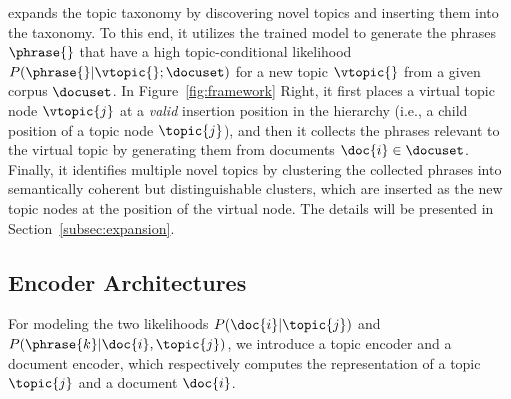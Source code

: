 \label{subsubsec:expansion}
\proposed expands the topic taxonomy by discovering novel topics and inserting them into the taxonomy.
To this end, it utilizes the trained model to generate the phrases $\phrase{}$ that have a high topic-conditional likelihood $P(\phrase{}|\vtopic{};\docuset)$ for a new topic $\vtopic{}$ from a given corpus $\docuset$.
In Figure~\ref{fig:framework} Right, it first places a virtual topic node $\vtopic{j}$ at a \textit{valid} insertion position in the hierarchy (i.e., a child position of a topic node $\topic{j}$), and then it collects the phrases relevant to the virtual topic by generating them from documents $\doc{i}\in\docuset$.
Finally, it identifies multiple novel topics by clustering the collected phrases into semantically coherent but distinguishable clusters, which are inserted as the new topic nodes at the position of the virtual node.
The details will be presented in Section~\ref{subsec:expansion}.

\subsection{Encoder Architectures}
\label{subsec:training}
For modeling the two likelihoods $P(\doc{i}|\topic{j})$ and $P(\phrase{k}|\doc{i},\topic{j})$, we introduce a topic encoder and a document encoder, which respectively computes the representation of a topic $\topic{j}$ and a document $\doc{i}$.

